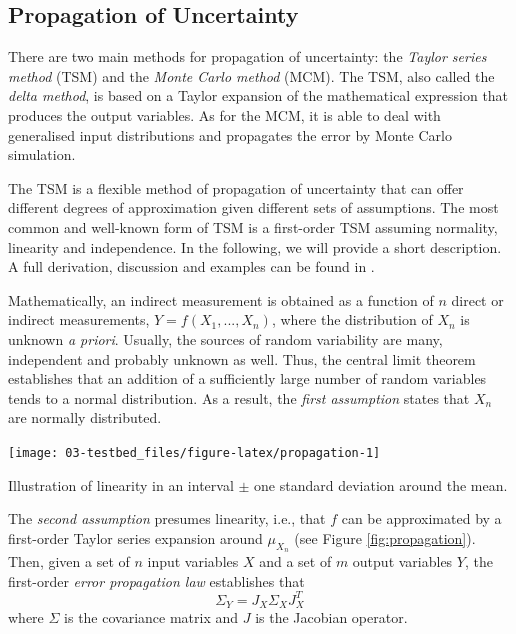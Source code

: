 \documentclass[twoside,nohyper]{tufte-book}
\theoremstyle{definition}
\theoremstyle{definition}
\theoremstyle{definition}
\theoremstyle{remark}
\begin{document}
\hypertarget{propagation-of-uncertainty}{%
\subsection{Propagation of
Uncertainty}\label{propagation-of-uncertainty}}

There are two main methods for propagation of uncertainty: the
\emph{Taylor series method} (TSM) and the \emph{Monte Carlo method}
(MCM). The TSM, also called the \emph{delta method}, is based on a
Taylor expansion of the mathematical expression that produces the output
variables. As for the MCM, it is able to deal with generalised input
distributions and propagates the error by Monte Carlo simulation.

The TSM is a flexible method of propagation of uncertainty that can
offer different degrees of approximation given different sets of
assumptions. The most common and well-known form of TSM is a first-order
TSM assuming normality, linearity and independence. In the following, we
will provide a short description. A full derivation, discussion and
examples can be found in \citet{Arras:1998}.

Mathematically, an indirect measurement is obtained as a function of
\(n\) direct or indirect measurements, \(Y = f(X_1, ..., X_n)\), where
the distribution of \(X_n\) is unknown \emph{a priori}. Usually, the
sources of random variability are many, independent and probably unknown
as well. Thus, the central limit theorem establishes that an addition of
a sufficiently large number of random variables tends to a normal
distribution. As a result, the \emph{first assumption} states that
\(X_n\) are normally distributed.




\begin{marginfigure}[-1in]

{\centering \texttt{[image: 03-testbed\_files/figure-latex/propagation-1]} 

}

\caption[Illustration of linearity in an interval \(\pm\) one
standard deviation around the mean.]{Illustration of linearity in an interval \(\pm\) one
standard deviation around the mean.}\label{fig:propagation}
\end{marginfigure}

The \emph{second assumption} presumes linearity, i.e., that \(f\) can be
approximated by a first-order Taylor series expansion around
\(\mu_{X_n}\) (see Figure \ref{fig:propagation}). Then, given a set of
\(n\) input variables \(X\) and a set of \(m\) output variables \(Y\),
the first-order \emph{error propagation law} establishes that
%
\begin{equation}
  \Sigma_Y = J_X \Sigma_X J_X^T \label{eq:assumption2}
\end{equation}
%
where \(\Sigma\) is the covariance matrix and \(J\) is the Jacobian
operator.
\end{document}

